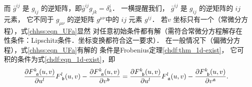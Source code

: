 而 $\bar{g}^{i j}$ 是 $g_{i j}$ 的逆矩阵，即$ \bar{g}^{i j} g_{j k}=\delta_k^i $．
一横提醒我们， $\bar{g}^{i j}$ 是 $g_{i j}$ 的逆矩阵的 $i j$ 元素，
它不同于 $g_{\mu \nu}$ 的逆矩阵 $g^{\mu \nu}$中的 $i j$ 元素 $g^{i j}$．
若$v$ 坐标只有一个（常微分方程），式\eqref{chhss:eqn_UFa}显然
对任意初始条件都有解（需符合常微分方程解存在性条件：Lipschitz条件．坐标变换都符合这一要求）．
在一般情况下（偏微分方程），式\eqref{chhss:eqn_UFa}有解的
条件是Frobenius定理\ref{chdf:thm_1d-exist}，
它可积的条件为式\eqref{chdf:eqn_1d-exist}，即
\begin{equation}\label{chhss:eqn_Frosn}
    \frac{\partial F^k_{\hphantom{k}\mathfrak{a}}(u, v)}{\partial u^l} F^l_{\hphantom{l}\mathfrak{b}}(u, v)
    -\frac{\partial F^k_{\hphantom{k}\mathfrak{a}}(u, v)}{\partial v^{\mathfrak{b}}} 
    =\frac{\partial F^k_{\hphantom{k}\mathfrak{b}}(u, v)}{\partial u^l} F^l_{\hphantom{l}\mathfrak{a}}(u, v)
    -\frac{\partial F^k_{\hphantom{k}\mathfrak{b}}(u, v)}{\partial v^{\mathfrak{a}}} .
\end{equation}


